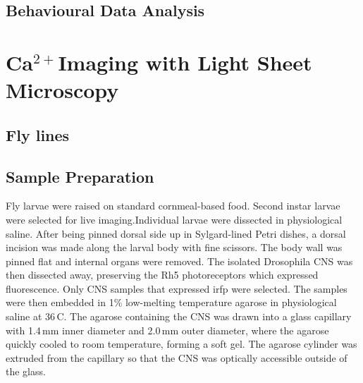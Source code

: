 \subsection{Behavioural Data Analysis}




















\section{Ca\texorpdfstring{$^{2+}$}{2+}Imaging with Light Sheet Microscopy}
    \subsection{Fly lines} %
    \subsection{Sample Preparation}
    Fly larvae were raised on standard cornmeal-based food.
    Second instar larvae were selected for live imaging.Individual larvae were dissected in physiological saline.
    After being pinned dorsal side up in Sylgard-lined Petri dishes, a dorsal incision was made along the larval body with fine scissors. The body wall was pinned flat and internal organs were removed. The isolated Drosophila CNS was then dissected away, preserving the Rh5 photoreceptors which expressed fluorescence.  Only CNS samples that expressed irfp were selected.%
    The samples were then embedded in 1\% low-melting temperature agarose in physiological saline at 36\,\textdegree C. The agarose containing the CNS was drawn into a glass capillary with 1.4\,mm inner diameter and 2.0\,mm outer diameter, where the agarose quickly cooled to room temperature, forming a soft gel. The agarose cylinder was extruded from the capillary so that the CNS was optically accessible outside of the glass. %
